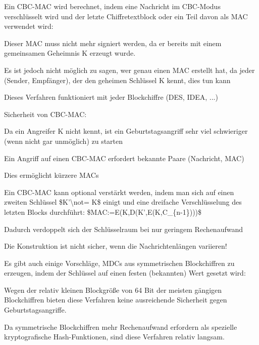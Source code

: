 \documentclass[a4paper]{article}
\begin{document}
\begin{multicols}{3}
      \begin{itemize*}
            \item Ein CBC-MAC wird berechnet, indem eine Nachricht im CBC-Modus
            verschlüsselt wird und der letzte Chiffretextblock oder ein Teil davon
            als MAC verwendet wird:
            \item Dieser MAC muss nicht mehr signiert werden, da er bereits mit einem
            gemeinsamen Geheimnis K erzeugt wurde.
            \begin{itemize*}
                  \item Es ist jedoch nicht möglich zu sagen, wer genau einen MAC erstellt hat, da jeder (Sender, Empfänger), der den geheimen Schlüssel K kennt, dies tun kann
            \end{itemize*}
            \item Dieses Verfahren funktioniert mit jeder Blockchiffre (DES, IDEA, ...)
            \item Sicherheit von CBC-MAC:
            \begin{itemize*}
                  \item Da ein Angreifer K nicht kennt, ist ein Geburtstagsangriff sehr viel schwieriger (wenn nicht gar unmöglich) zu starten
                  \item Ein Angriff auf einen CBC-MAC erfordert bekannte Paare (Nachricht, MAC)
                  \item Dies ermöglicht kürzere MACs
                  \item Ein CBC-MAC kann optional verstärkt werden, indem man sich auf einen zweiten Schlüssel \$K'\textbackslash not= K\$ einigt und eine dreifache Verschlüsselung des letzten Blocks durchführt: \$MAC:=E(K,D(K',E(K,C\_\{n-1\})))\$
                  \item Dadurch verdoppelt sich der Schlüsselraum bei nur geringem Rechenaufwand
                  \item Die Konstruktion ist nicht sicher, wenn die Nachrichtenlängen variieren!
            \end{itemize*}
            \item Es gibt auch einige Vorschläge, MDCs aus symmetrischen Blockchiffren
            zu erzeugen, indem der Schlüssel auf einen festen (bekannten) Wert
            gesetzt wird:
            \begin{itemize*}
                  \item Wegen der relativ kleinen Blockgröße von 64 Bit der meisten gängigen Blockchiffren bieten diese Verfahren keine ausreichende Sicherheit gegen Geburtstagsangriffe.
                  \item Da symmetrische Blockchiffren mehr Rechenaufwand erfordern als spezielle kryptografische Hash-Funktionen, sind diese Verfahren relativ langsam.
            \end{itemize*}
      \end{itemize*}



\end{multicols}
\end{document}
